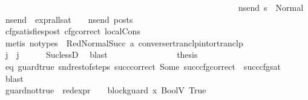 \begin{isabellebody}
\ \ \ \ \ \ \ \ \ \ \ \ \ \ \ \ \ \ \ \ \ \ \ \ \ \ \ \ \ \ \ \ \ \ \ \ \ \ \ \ \ \ \ \ \ \ \ \ \ \ \ \ \ \ \ \ {\isacharparenleft}{\kern0pt}{\isasymforall}ns{\isacharunderscore}{\kern0pt}end{\isachardot}{\kern0pt}\ s{\isacharprime}{\kern0pt}\ {\isacharequal}{\kern0pt}\ Normal\ ns{\isacharunderscore}{\kern0pt}end\ {\isasymlongrightarrow}\ {\isacharparenleft}{\kern0pt}expr{\isacharunderscore}{\kern0pt}all{\isacharunderscore}{\kern0pt}sat\ {\isasymLambda}\ {\isasymGamma}\ {\isasymOmega}\ ns{\isacharunderscore}{\kern0pt}end{\isacharparenright}{\kern0pt}\ posts{\isacharparenright}{\kern0pt}{\isacharparenright}{\kern0pt}{\isacharparenright}{\kern0pt}{\isacharparenright}{\kern0pt}{\isachardoublequoteclose}\isanewline
\ \ \ \ \ \ \ \ \ \ \ \ \ \ \ \ \isamarkupfalse%
\ cfg{\isacharunderscore}{\kern0pt}satisfies{\isacharunderscore}{\kern0pt}post\ cfg{\isacharunderscore}{\kern0pt}correct\ local{\isachardot}{\kern0pt}Cons\isanewline
\ \ \ \ \ \ \ \ \ \ \ \ \ \ \ \ \isamarkupfalse%
\ {\isacharparenleft}{\kern0pt}metis\ {\isacharparenleft}{\kern0pt}no{\isacharunderscore}{\kern0pt}types{\isacharparenright}{\kern0pt}\ {\isachardoublequoteopen}{}{\isachardoublequoteclose}\ RedNormalSucc\ a{}\ converse{\isacharunderscore}{\kern0pt}rtranclp{\isacharunderscore}{\kern0pt}into{\isacharunderscore}{\kern0pt}rtranclp{\isacharparenright}{\kern0pt}\isanewline
\isanewline
\ \ \ \ \ \ \ \ \ \ \ \ \ \ \isamarkupfalse%
\ {\isachardoublequoteopen}j{\isacharprime}{\kern0pt}{\isacharprime}{\kern0pt}\ {\isacharless}{\kern0pt}\ j{\isachardoublequoteclose}\ \isamarkupfalse%
\ {}\ {}\ \isamarkupfalse%
\ Suc{\isacharunderscore}{\kern0pt}lessD\ \isamarkupfalse%
\ blast\isanewline
\isanewline
\ \ \ \ \ \ \ \ \ \ \ \ \ \ \isamarkupfalse%
\ {\isacharquery}{\kern0pt}thesis\ \isamarkupfalse%
\ eq\ guard{\isacharunderscore}{\kern0pt}true\ snd{\isacharunderscore}{\kern0pt}rest{\isacharunderscore}{\kern0pt}of{\isacharunderscore}{\kern0pt}steps\ succ{\isacharunderscore}{\kern0pt}correct\ Some\ succ{\isacharunderscore}{\kern0pt}cfg{\isacharunderscore}{\kern0pt}correct\ {}\ succ{\isacharunderscore}{\kern0pt}cfg{\isacharunderscore}{\kern0pt}sat\ \isamarkupfalse%
\ blast\isanewline
\ \ \ \ \ \ \ \ \ \ \ \ \isamarkupfalse%
\isanewline
\ \ \ \ \ \ \ \ \ \ \ \ \ \ \isamarkupfalse%
\ guard{\isacharunderscore}{\kern0pt}not{\isacharunderscore}{\kern0pt}true{\isacharcolon}{\kern0pt}\ {\isachardoublequoteopen}{\isasymnot}\ {\isacharparenleft}{\kern0pt}red{\isacharunderscore}{\kern0pt}expr\ {\isasymLambda}\ {\isasymGamma}\ {\isasymOmega}\ block{\isacharunderscore}{\kern0pt}guard\ x{}\ {\isacharparenleft}{\kern0pt}BoolV\ True{\isacharparenright}{\kern0pt}{\isacharparenright}{\kern0pt}{\isachardoublequoteclose}\isanewline

\end{isabellebody}
